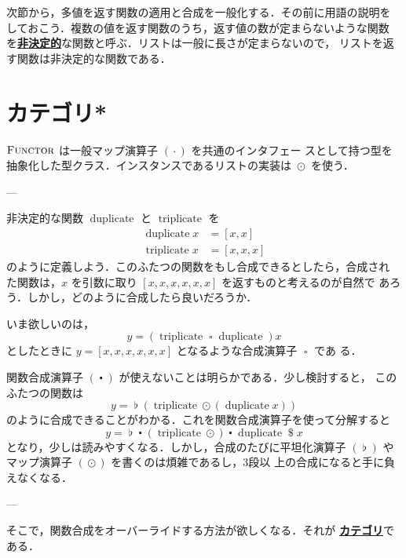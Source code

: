 \documentclass[a5paper,twoside,fleqn,draft]{jsbook}
\newcommand{\TK}[1]{\mask{\textbf{TK:}~#1}{C}}
\newcommand{\keyword}[1]{{\underline{\textbf{#1}}}}
\newcommand{\mSpecialFunc}[1]{#1}
\DeclareMathOperator{\mDuplicate}{\mSpecialFunc{duplicate}}
\DeclareMathOperator{\mTriplicate}{\mSpecialFunc{triplicate}}
\DeclareMathOperator{\mApply}{\$}
\DeclareMathOperator{\mComp}{\centerdot}
\DeclareMathOperator{\mJoinList}{\flat} %
\DeclareMathOperator{\mMap}{\cdot}
\DeclareMathOperator{\mMapList}{\odot}
\DeclareMathOperator{\mSomeOp}{\square}
\newcommand{\mTypeClass}[1]{\textsc{#1}} %
\newcommand{\mFunctorTypeClass}{\mTypeClass{Functor}}
\begin{document}
次節から，多値を返す関数の適用と合成を一般化する．その前に用語の説明を
しておこう．複数の値を返す関数のうち，返す値の数が定まらないような関数
を\keyword{非決定的}な関数と呼ぶ．リストは一般に長さが定まらないので，
リストを返す関数は非決定的な関数である．


\section{カテゴリ*}

\TK{Writing.}

$\mFunctorTypeClass$ は一般マップ演算子 $(\mMap)$ を共通のインタフェー
スとして持つ型を抽象化した型クラス．インスタンスであるリストの実装は
$\mMapList$ を使う．

---

非決定的な関数 $\mDuplicate$ と $\mTriplicate$ を
\begin{align}
  \mDuplicate x
  &=[x,x]\\
  \mTriplicate x
  &=[x,x,x]
\end{align}
のように定義しよう．このふたつの関数をもし合成できるとしたら，合成され
た関数は，$x$ を引数に取り $[x,x,x,x,x,x]$ を返すものと考えるのが自然で
あろう．しかし，どのように合成したら良いだろうか．

いま欲しいのは，
\begin{equation}
  y
  =(\mTriplicate\mSomeOp\mDuplicate)x
\end{equation}
としたときに $y=[x,x,x,x,x,x]$ となるような合成演算子 $\mSomeOp$ であ
る．

関数合成演算子 $(\mComp)$ が使えないことは明らかである．少し検討すると，
このふたつの関数は
\begin{equation}
  y
  =\mJoinList(\mTriplicate\mMapList{}(\mDuplicate x))
\end{equation}
のように合成できることがわかる．これを関数合成演算子を使って分解すると
\begin{equation}
  \label{eq:triplicate-duplicate}
  y
  =\mJoinList\mComp{}(\mTriplicate\mMapList)\mComp\mDuplicate\mApply x
\end{equation}
となり，少しは読みやすくなる．しかし，合成のたびに平坦化演算子
$(\mJoinList)$ やマップ演算子 $(\mMapList)$ を書くのは煩雑であるし，3段以
上の合成になると手に負えなくなる．

---

そこで，関数合成をオーバーライドする方法が欲しくなる．それが
\keyword{カテゴリ}である．
\end{document}
